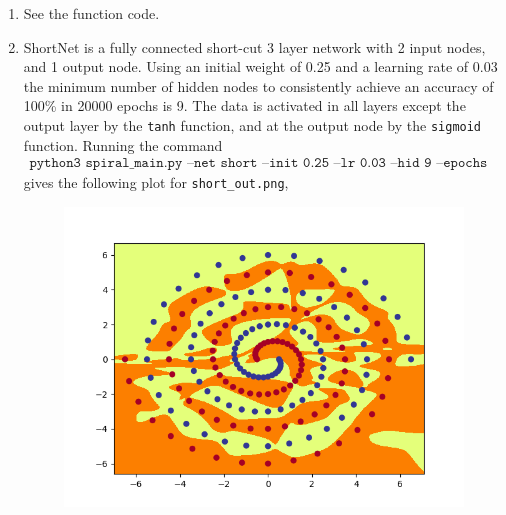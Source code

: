 \documentclass[a4paper,11pt]{article}
\newcommand{\code}{\texttt}
\begin{document}
{{\begin{enumerate}[leftmargin=*]
		\item See the function code.
		\item ShortNet is a fully connected short-cut 3 layer network with 2 input nodes, and 1 output node. Using an initial weight of 0.25 and a learning rate of 0.03 the minimum number of hidden nodes to consistently achieve an accuracy of 100\% in 20000 epochs is 9. The data is activated in all layers except the output layer by the \code{tanh} function, and at the output node by the \code{sigmoid} function. Running the command
			\begin{align*}
				\code{python3 spiral\_main.py --net short --init 0.25 --lr 0.03 --hid 9 --epochs 20000}
			\end{align*}
			gives the following plot for \code{short\_out.png},
			\begin{figure}[!ht]
				\includegraphics[width=\linewidth]{shortout.png}
			\end{figure}

			\break


\end{enumerate}}}
\end{document}
